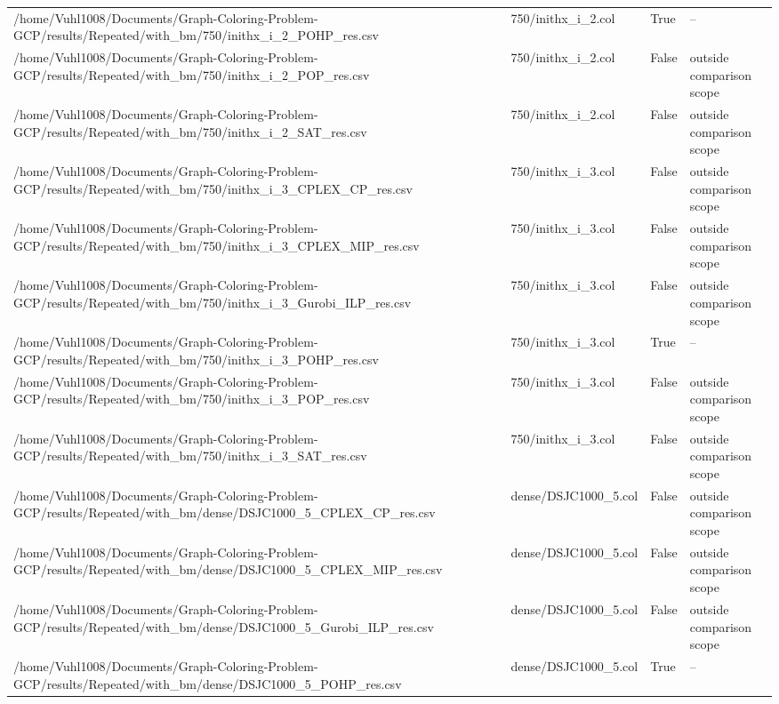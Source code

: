 \begin{table}[htbp]
\begin{tabular}{llll}
/home/Vuhl1008/Documents/Graph-Coloring-Problem-GCP/results/Repeated/with\_bm/750/inithx\_i\_2\_POHP\_res.csv & 750/inithx\_i\_2.col & True & -- \\
/home/Vuhl1008/Documents/Graph-Coloring-Problem-GCP/results/Repeated/with\_bm/750/inithx\_i\_2\_POP\_res.csv & 750/inithx\_i\_2.col & False & outside comparison scope \\
/home/Vuhl1008/Documents/Graph-Coloring-Problem-GCP/results/Repeated/with\_bm/750/inithx\_i\_2\_SAT\_res.csv & 750/inithx\_i\_2.col & False & outside comparison scope \\
/home/Vuhl1008/Documents/Graph-Coloring-Problem-GCP/results/Repeated/with\_bm/750/inithx\_i\_3\_CPLEX\_CP\_res.csv & 750/inithx\_i\_3.col & False & outside comparison scope \\
/home/Vuhl1008/Documents/Graph-Coloring-Problem-GCP/results/Repeated/with\_bm/750/inithx\_i\_3\_CPLEX\_MIP\_res.csv & 750/inithx\_i\_3.col & False & outside comparison scope \\
/home/Vuhl1008/Documents/Graph-Coloring-Problem-GCP/results/Repeated/with\_bm/750/inithx\_i\_3\_Gurobi\_ILP\_res.csv & 750/inithx\_i\_3.col & False & outside comparison scope \\
/home/Vuhl1008/Documents/Graph-Coloring-Problem-GCP/results/Repeated/with\_bm/750/inithx\_i\_3\_POHP\_res.csv & 750/inithx\_i\_3.col & True & -- \\
/home/Vuhl1008/Documents/Graph-Coloring-Problem-GCP/results/Repeated/with\_bm/750/inithx\_i\_3\_POP\_res.csv & 750/inithx\_i\_3.col & False & outside comparison scope \\
/home/Vuhl1008/Documents/Graph-Coloring-Problem-GCP/results/Repeated/with\_bm/750/inithx\_i\_3\_SAT\_res.csv & 750/inithx\_i\_3.col & False & outside comparison scope \\
/home/Vuhl1008/Documents/Graph-Coloring-Problem-GCP/results/Repeated/with\_bm/dense/DSJC1000\_5\_CPLEX\_CP\_res.csv & dense/DSJC1000\_5.col & False & outside comparison scope \\
/home/Vuhl1008/Documents/Graph-Coloring-Problem-GCP/results/Repeated/with\_bm/dense/DSJC1000\_5\_CPLEX\_MIP\_res.csv & dense/DSJC1000\_5.col & False & outside comparison scope \\
/home/Vuhl1008/Documents/Graph-Coloring-Problem-GCP/results/Repeated/with\_bm/dense/DSJC1000\_5\_Gurobi\_ILP\_res.csv & dense/DSJC1000\_5.col & False & outside comparison scope \\
/home/Vuhl1008/Documents/Graph-Coloring-Problem-GCP/results/Repeated/with\_bm/dense/DSJC1000\_5\_POHP\_res.csv & dense/DSJC1000\_5.col & True & -- \\

\end{tabular}
\end{table}
